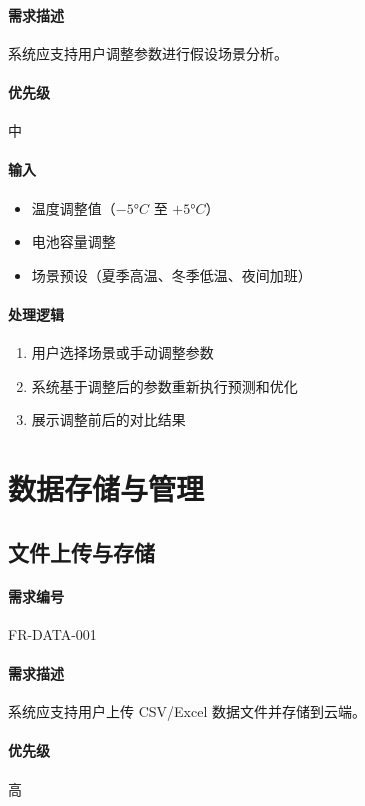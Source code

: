 \paragraph{需求描述} 系统应支持用户调整参数进行假设场景分析。

\paragraph{优先级} 中

\paragraph{输入}
\begin{itemize}
    \item 温度调整值（$-5°C$ 至 $+5°C$）
    \item 电池容量调整
    \item 场景预设（夏季高温、冬季低温、夜间加班）
\end{itemize}

\paragraph{处理逻辑}
\begin{enumerate}
    \item 用户选择场景或手动调整参数
    \item 系统基于调整后的参数重新执行预测和优化
    \item 展示调整前后的对比结果
\end{enumerate}

\section{数据存储与管理}

\subsection{文件上传与存储}

\paragraph{需求编号} FR-DATA-001

\paragraph{需求描述} 系统应支持用户上传 CSV/Excel 数据文件并存储到云端。

\paragraph{优先级} 高

